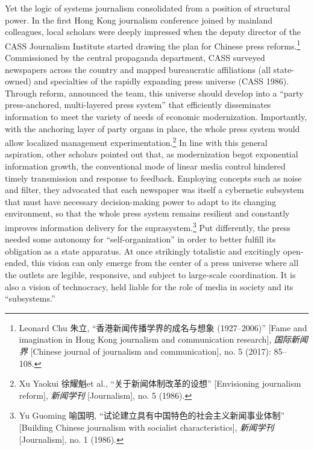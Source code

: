 \documentclass{tufte-handout}
\begin{document}
\begin{CJK*}{UTF8}{gbsn}
Yet the logic of systems journalism consolidated from a position of
structural power. In the first Hong Kong journalism conference joined by
mainland colleagues, local scholars were deeply impressed when the
deputy director of the CASS Journalism Institute started drawing the
plan for Chinese press reforms.\footnote{Leonard Chu 朱立,
  ``香港新闻传播学界的成名与想象 (1927--2006)'' {[}Fame and imagination
  in Hong Kong journalism and communication research{]},
  \emph{国际新闻界} {[}Chinese journal of journalism and
  communication{]}, no. 5 (2017): 85--108.} Commissioned by the central
propaganda department, CASS surveyed newspapers across the country and
mapped bureaucratic affiliations (all state-owned) and specialties of
the rapidly expanding press universe (CASS 1986). Through reform,
announced the team, this universe should develop into a ``party
press-anchored, multi-layered press system'' that efficiently
disseminates information to meet the variety of needs of economic
modernization. Importantly, with the anchoring layer of party organs in
place, the whole press system would allow localized management
experimentation.\footnote{Xu Yaokui 徐耀魁et al.,
  ``关于新闻体制改革的设想'' {[}Envisioning journalism reform{]},
  \emph{新闻学刊} {[}Journalism{]}, no. 5 (1986).} In line with this
general aspiration, other scholars pointed out that, as modernization
begot exponential information growth, the conventional mode of linear
media control hindered timely transmission and response to feedback.
Employing concepts such as noise and filter, they advocated that each
newspaper was itself a cybernetic subsystem that must have necessary
decision-making power to adapt to its changing environment, so that the
whole press system remains resilient and constantly improves information
delivery for the suprasystem.\footnote{Yu Guoming 喻国明,
  ``试论建立具有中国特色的社会主义新闻事业体制'' {[}Building Chinese
  journalism with socialist characteristics{]}, \emph{新闻学刊}
  {[}Journalism{]}, no. 1 (1986).} Put differently, the press needed
some autonomy for ``self-organization'' in order to better fulfill its
obligation as a state apparatus. At once strikingly totalistic and
excitingly open-ended, this vision can only emerge from the center of a
press universe where all the outlets are legible, responsive, and
subject to large-scale coordination. It is also a vision of technocracy,
held liable for the role of media in society and its ``subsystems.''


\end{CJK*}
\end{document}
